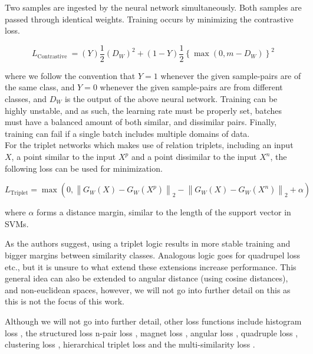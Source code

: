 \documentclass[a4paper,12pt,twoside,openright]{report}
\begin{document}
Two samples are ingested by the neural network simultaneously.
Both samples are passed through identical weights.
Training occurs by minimizing the contrastive loss.

\begin{equation}
L_{\text {Contrastive }}=(Y) \frac{1}{2}\left(D_{W}\right)^{2}+(1-Y) \frac{1}{2}\left\{\max \left(0, m-D_{W}\right)\right\}^{2}
\end{equation}

where we follow the convention that $Y=1$ whenever the given sample-pairs are of the same class, and $Y=0$ whenever the given sample-pairs are from different classes, and $D_W$ is the output of the above neural network.
Training can be highly unstable, and as such, the learning rate must be properly set, batches must have a balanced amount of both similar, and dissimilar pairs. 
Finally, training can fail if a single batch includes multiple domains of data. \\

For the triplet networks \cite{dor09} which makes use of relation triplets, including an input $X$, a point similar to the input $X^p$ and a point dissimilar to the input $X^n$, the following loss can be used for minimization.

\begin{equation}
L_{\text {Triplet}}=\max \left(0,\left\|G_{W}(X)-G_{W}\left(X^{p}\right)\right\|_{2}-\left\|G_{W}(X)-G_{W}\left(X^{n}\right)\right\|_{2}+\alpha\right)
\end{equation} 

where $\alpha$ forms a distance margin, similar to the length of the support vector in SVMs.

As the authors suggest, using a triplet logic results in more stable training and bigger margins between similarity classes.
Analogous logic goes for quadrupel loss etc., but it is unsure to what extend these extensions increase performance.
This general idea can also be extended to angular distance (using cosine distances), and non-euclidean spaces, however, we will not go into further detail on this as this is not the focus of this work.

Although we will not go into further detail, other loss functions include histogram loss \cite{ustinova16}, the structured loss \cite{song16} n-pair loss \cite{sohn16}, magnet loss \cite{rippel16}, angular loss \cite{wang17}, quadruple loss \cite{ni17}, clustering loss \cite{song17}, hierarchical triplet loss \cite{ge18} and the multi-similarity loss \cite{wang19c}.
\end{document}

